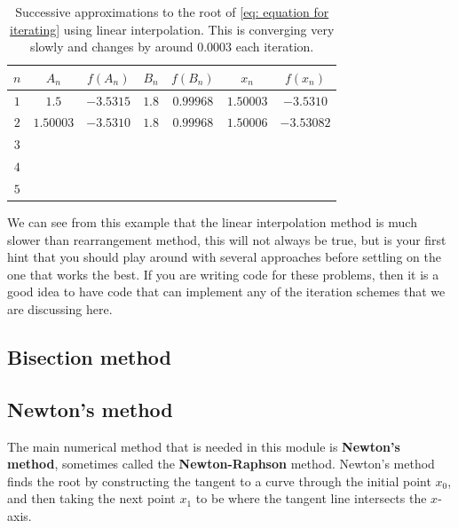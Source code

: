 \begin{table}[ht]
\centering
\caption{Successive approximations to the root of \cref{eq: equation for iterating} using linear interpolation. This is converging very slowly and changes by around $0.0003$ each iteration. }

\vspace{2mm}

\label{table:2}



\begin{tabular}{|c|c|c|c|c|c|c|} 
 \hline
$n$& $A_{n}$ &$f(A_{n})$& $B_{n}$ & $f(B_{n})$& $x_{n}$& $f(x_{n})$\\
 \hline
 $1$ & $1.5$ & $-3.5315$& $1.8$ &$0.99968$& $1.50003$&  $-3.5310$\\
 \hline
 $2$& $1.50003$&$-3.5310$&$1.8$ &$0.99968$& $1.50006$&$-3.53082$\\
 \hline
 $3$& & & & & & \\
 \hline
 $4$& & & & & &\\
 \hline
 $5$& & & & & &\\
 \hline
\end{tabular}
\end{table}


We can see from this example that the linear interpolation method is much slower than rearrangement method, this will not always be true, but is your first hint that you should play around with several approaches before settling on the one that works the best. If you are writing code for these problems, then it is a good idea to have code that can implement any of the iteration schemes that we are discussing here.

\subsection*{Bisection method}

\subsection*{Newton's method}
The main numerical method that is needed in this module is \textbf{Newton's method}, sometimes called the \textbf{Newton-Raphson} method. Newton's method finds the root by constructing the tangent to a curve through the initial point $x_{0}$, and then taking the next point $x_{1}$ to be where the tangent line intersects the $x$-axis.\\

